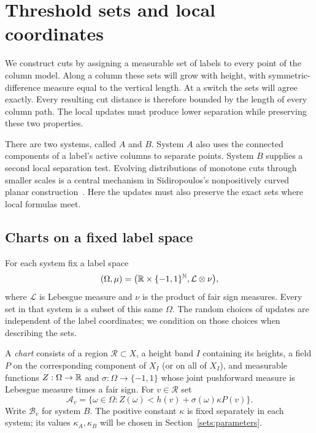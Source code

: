 \section{Threshold sets and local coordinates}
\label{sets:section}

We construct cuts by assigning a measurable set of labels to every point
of the column model. Along a column these sets will grow with height,
with symmetric-difference measure equal to the vertical length. At a
switch the sets will agree exactly. Every resulting cut distance is
therefore bounded by the length of every column path. The local updates
must produce lower separation while preserving these two properties.

There are two systems, called $A$ and $B$. System $A$ also uses the
connected components of a label's active columns to separate points.
System $B$ supplies a second local separation test. Evolving distributions
of monotone cuts through smaller scales is a central mechanism in
Sidiropoulos's nonpositively curved planar construction~\cite[Sections~4--5]{Sidiropoulos13}.
Here the updates must also preserve the exact sets where local formulas meet.

\subsection{Charts on a fixed label space}

For each system fix a label space
\[
 (\Omega,\mu)=\bigl(\mathbb R\times\{-1,1\}^{\mathbb N},
                   \mathcal L\otimes\nu\bigr),
\]
where $\mathcal L$ is Lebesgue measure and $\nu$ is the product of fair sign
measures. Every set in that system is a subset of this same $\Omega$.
The random choices of updates are independent of the label coordinates;
we condition on those choices when describing the sets.

A \emph{chart} consists of a region $\mathcal R\subset X$, a height band
$I$ containing its heights, a field $P$ on the corresponding component of
$X_I$ (or on all of $X_I$), and measurable functions
$Z:\Omega\to\mathbb R$ and $\sigma:\Omega\to\{-1,1\}$ whose joint pushforward
measure is Lebesgue measure times a fair sign. For $v\in\mathcal R$ set
\begin{equation}\label{sets:formula}
 \mathcal A_v=\{\omega\in\Omega:
 Z(\omega)<h(v)+\sigma(\omega)\kappa P(v)\}.
\end{equation}
Write $\mathcal B_v$ for system $B$. The positive constant $\kappa$ is
fixed separately in each system; its values $\kappa_A,\kappa_B$ will be
chosen in Section~\ref{sets:parameters}.


